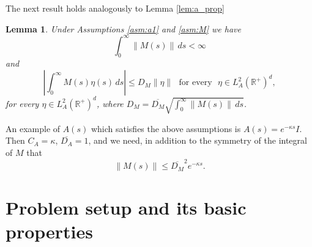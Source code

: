 \documentclass[11pt, leqno]{amsart}
\newtheorem{lem}[thm]{Lemma}
\theoremstyle{definition}
\def\R{\mathbb{R}}
\begin{document}
The next result holds analogously to Lemma \ref{lem:a_prop}
\begin{lem}\label{lem:M}
	Under Assumptions \ref{asm:a1} and \ref{asm:M} we have
	$$
	\int_0^\infty \|M(s)\|\, ds < \infty
	$$
	and
	$$
	\left| \int_0^\infty M(s)\eta(s)\, ds \right|\leq D_M \|\eta\|\ \ \ \textrm{for every}\ \ \ \eta\in L^2_A(\R^+)^d,
	$$
	for every $\eta\in L^2_A(\R^+)^d$, where $D_M = \overline{D_M}\sqrt{\int_0^\infty \|M(s)\|\, ds}$.
\end{lem}
An example of $A(s)$ which satisfies the above assumptions is $A(s)=e^{-\kappa s} I$. Then $C_A=\kappa$, $\overline{D_A} = 1$, and we need, in addition to the symmetry of the integral of $M$ that
$$
\|M(s)\|\leq \overline{D_M}^2 e^{-\kappa s}.
$$



\section{Problem setup and its basic properties}\label{sec:setup}
\end{document}
